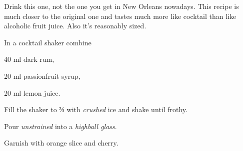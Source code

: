 \startsection[title={Hurricane},reference=hurricane]
Drink this one, not the one you get in New Orleans nowadays. This recipe
is much closer to the original one and tastes much more like cocktail
than like alcoholic fruit juice. Also it's reasonably sized.

\startitemize
\item In a cocktail shaker combine
      \startitemize
      \item 40 ml dark rum,
      \item 20 ml passionfruit syrup,
      \item 20 ml lemon juice.
      \stopitemize
\item Fill the shaker to ⅔ with {\em crushed} ice and shake until frothy.
\item Pour {\em unstrained} into a {\em highball glass}.
\item Garnish with \tr orange slice and cherry.
\stopitemize
\stopsection
